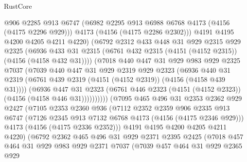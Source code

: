 \begin{lexlean}{RustCore}
\begin{coremodule}
                  @906
                  @2285
                  @913
                  @6747
                  (@6982 @2295 @913 @6988 @6768 @4173 (@4156 (@4175 @2296 @929)))
                  @4173
                  (@4156 (@4175 @2286 @2302)))
                @4191
                @4195
                @4200
                @4205
                @4211
                @4220)
              (@6792
                @2312
                @433
                @448
                @31
                @929
                @2315
                @929
                @2325
                (@6936
                  @433
                  @31
                  @2315
                  (@6761 @432 @2315 (@4151 (@4152 @2315)) (@4156 (@4158 @432 @31))))
                (@7018
                  @440
                  @447
                  @31
                  @929
                  @983
                  @929
                  @2325
                  @7037
                  (@7039
                    @440
                    @447
                    @31
                    @929
                    @2319
                    @929
                    @2323
                    (@6936
                      @440
                      @31
                      @2319
                      (@6761 @439 @2319 (@4151 (@4152 @2319)) (@4156 (@4158 @439 @31))))
                    (@6936
                      @447
                      @31
                      @2323
                      (@6761 @446 @2323 (@4151 (@4152 @2323)) (@4156 (@4158 @446 @31))))))))))
        (@7095
          @465
          @496
          @31
          @2353
          @2362
          @929
          @2427
          (@7105
            @2353
            @2360
            @936
            (@7112
              @2352
              @2359
              @906
              @2335
              @913
              @6747
              (@7126 @2345 @913 @7132 @6768 @4173 (@4156 (@4175 @2346 @929)))
              @4173
              (@4156 (@4175 @2336 @2352)))
            @4191
            @4195
            @4200
            @4205
            @4211
            @4220)
          (@6792
            @2362
            @465
            @496
            @31
            @929
            @2371
            @2395
            @2425
            (@7018
              @457
              @464
              @31
              @929
              @983
              @929
              @2371
              @7037
              (@7039
                @457
                @464
                @31
                @929
                @2365
                @929

\end{coremodule}
\end{lexlean}
